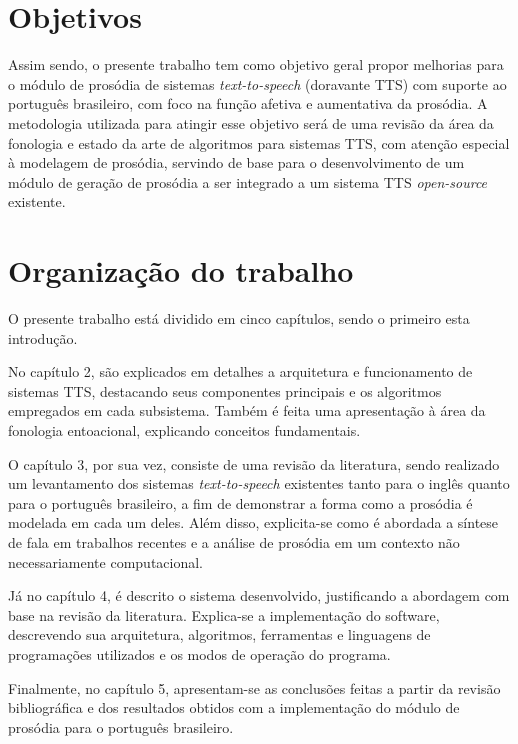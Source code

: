 \section{Objetivos}
Assim sendo, o presente trabalho tem como objetivo geral propor melhorias para o
módulo de prosódia de sistemas \emph{text-to-speech} (doravante TTS)
com suporte ao português brasileiro, com foco na função afetiva e aumentativa da
prosódia. A metodologia utilizada para atingir esse objetivo será de uma revisão
da área da fonologia e estado da arte de algoritmos para sistemas TTS, com
atenção especial à modelagem de prosódia, servindo de base para o
desenvolvimento de um módulo de geração de prosódia a ser integrado a um sistema
TTS \emph{open-source} existente.

\section{Organização do trabalho}
O presente trabalho está dividido em cinco capítulos, sendo o primeiro esta introdução.

No capítulo 2, são explicados em detalhes a arquitetura e funcionamento de sistemas
TTS, destacando seus componentes principais e os algoritmos empregados em cada
subsistema. Também é feita uma apresentação à área da fonologia entoacional,
explicando conceitos fundamentais.


O capítulo 3, por sua vez, consiste de uma revisão da literatura, sendo
realizado um levantamento dos sistemas \emph{text-to-speech} existentes tanto
para o inglês quanto para o português brasileiro, a fim de demonstrar a forma
como a prosódia é modelada em cada um deles. Além disso, explicita-se como é
abordada a síntese de fala em trabalhos recentes e a análise de prosódia em um
contexto não necessariamente computacional.

Já no capítulo 4, é descrito o sistema desenvolvido, justificando a abordagem com
base na revisão da literatura. Explica-se a implementação do software,
descrevendo sua arquitetura, algoritmos, ferramentas e linguagens de programações
utilizados e os modos de operação do programa.

Finalmente, no capítulo 5, apresentam-se as conclusões feitas a partir da revisão
bibliográfica e dos resultados obtidos com a implementação do módulo de prosódia
para o português brasileiro.